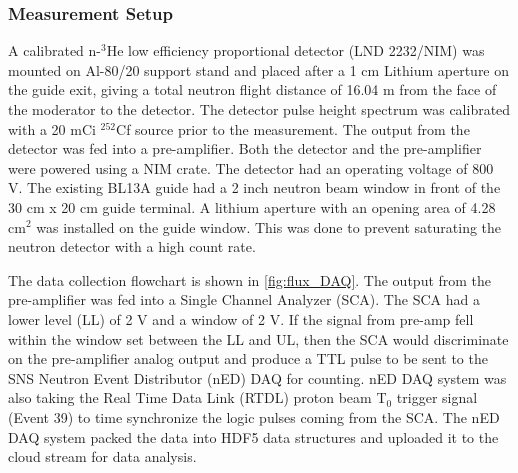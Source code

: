 \subsubsection{Measurement Setup}

A calibrated n-$^3$He low efficiency proportional detector (LND 2232/NIM) was mounted on Al-80/20 support stand and placed after a 1 cm Lithium aperture on the guide exit, giving a total neutron flight distance of 16.04 m from the face of the moderator to the detector. The detector pulse height spectrum was calibrated with a 20 mCi $^{252}$Cf source prior to the measurement. The output from the detector was fed into a pre-amplifier. Both the detector and the pre-amplifier were powered using a NIM crate. The detector had an operating voltage of 800 V. The existing BL13A guide had a 2 inch neutron beam window in front of the 30 cm x 20 cm guide terminal. A lithium aperture with an opening area of 4.28 cm$^2$ was installed on the guide window. This was done to prevent saturating the neutron detector with a high count rate.


The data collection flowchart is shown in \cref{fig:flux_DAQ}. The output from the pre-amplifier was fed into a Single Channel Analyzer (SCA). The SCA had a lower level (LL) of 2 V and a window of 2 V. If the signal from pre-amp fell within the window set between the LL and UL, then the SCA would discriminate on the pre-amplifier analog output and produce a TTL pulse to be sent to the SNS Neutron Event Distributor (nED) DAQ for counting. nED DAQ system was also taking the Real Time Data Link (RTDL) proton beam T$_0$ trigger signal (Event 39) to time synchronize the logic pulses coming from the SCA. The nED DAQ system packed the data into HDF5 data structures and uploaded it to the cloud stream for data analysis.

